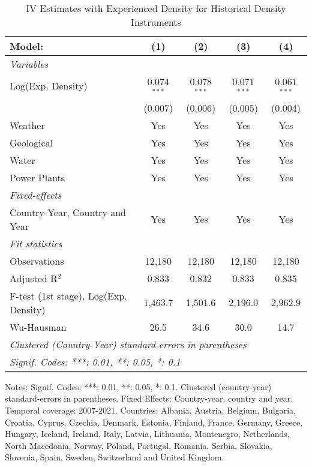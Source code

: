
\begin{table}[htbp]
   \caption{\label{tab:iv_hist_rob} IV Estimates with Experienced Density for Historical Density Instruments}
   \centering
   \small
   \begin{tabular}{lcccc}
      \tabularnewline \midrule \midrule
      Model:                                & (1)           & (2)           & (3)           & (4)\\  
      \midrule
      \emph{Variables}\\
      Log(Exp. Density)                     & 0.074$^{***}$ & 0.078$^{***}$ & 0.071$^{***}$ & 0.061$^{***}$\\   
                                            & (0.007)       & (0.006)       & (0.005)       & (0.004)\\   
      Weather                               & Yes           & Yes           & Yes           & Yes\\  
      Geological                            & Yes           & Yes           & Yes           & Yes\\  
      Water                                 & Yes           & Yes           & Yes           & Yes\\  
      Power Plants                          & Yes           & Yes           & Yes           & Yes\\  
      \midrule
      \emph{Fixed-effects}\\
      Country-Year, Country and Year        & Yes           & Yes           & Yes           & Yes\\  
      \midrule
      \emph{Fit statistics}\\
      Observations                          & 12,180        & 12,180        & 12,180        & 12,180\\  
      Adjusted R$^2$                        & 0.833         & 0.832         & 0.833         & 0.835\\  
      F-test (1st stage), Log(Exp. Density) & 1,463.7       & 1,501.6       & 2,196.0       & 2,962.9\\  
      Wu-Hausman                            & 26.5          & 34.6          & 30.0          & 14.7\\  
      \midrule \midrule
      \multicolumn{5}{l}{\emph{Clustered (Country-Year) standard-errors in parentheses}}\\
      \multicolumn{5}{l}{\emph{Signif. Codes: ***: 0.01, **: 0.05, *: 0.1}}\\
   \end{tabular}
   
   \par \raggedright 
   Notes: Signif. Codes: ***: 0.01, **: 0.05, *: 0.1. Clustered (country-year) standard-errors in parentheses. Fixed Effects: Country-year, country and year. Temporal coverage: 2007-2021. Countries: Albania, Austria, Belgium, Bulgaria, Croatia, Cyprus, Czechia, Denmark, Estonia, Finland, France, Germany, Greece, Hungary, Iceland, Ireland, Italy, Latvia, Lithuania, Montenegro, Netherlands, North Macedonia, Norway, Poland, Portugal, Romania, Serbia, Slovakia, Slovenia, Spain, Sweden, Switzerland and United Kingdom.
\end{table}


